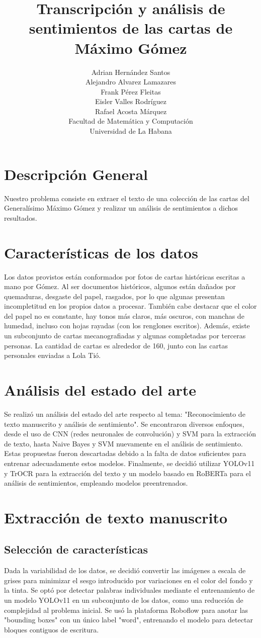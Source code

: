 \documentclass[11pt,a4paper]{article}
\title{Transcripción y análisis de sentimientos de las cartas de Máximo Gómez}
\author{
    Adrian Hernández Santos\\
    Alejandro Alvarez Lamazares\\
    Frank Pérez Fleitas\\
    Eisler Valles Rodríguez\\
    \vspace{5cm}
    Rafael Acosta Márquez\\
    \small{Facultad de Matemática y Computación}\\
    \small{Universidad de La Habana}
}
\begin{document}
\maketitle

\newpage

\section{Descripción General}
Nuestro problema consiste en extraer el texto de una colección de las cartas del Generalísimo Máximo Gómez y realizar un análisis de sentimientos a dichos resultados.

\section{Características de los datos}
Los datos provistos están conformados por fotos de cartas históricas escritas a mano por Gómez. 
Al ser documentos históricos, algunos están dañados por quemaduras, desgaste del papel, rasgados, por lo que algunas presentan incompletitud en los propios datos a procesar. 
También cabe destacar que el color del papel no es constante, hay tonos más claros, más oscuros, con manchas de humedad, incluso con hojas rayadas (con los renglones escritos). 
Además, existe un subconjunto de cartas mecanografiadas y algunas completadas por terceras personas. 
La cantidad de cartas es alrededor de 160, junto con las cartas personales enviadas a Lola Tió.

\section{Análisis del estado del arte}
Se realizó un análisis del estado del arte respecto al tema: "Reconocimiento de texto manuscrito y análisis de sentimiento". 
Se encontraron diversos enfoques, desde el uso de CNN (redes neuronales de convolución) y SVM para la extracción de texto, hasta Naive Bayes y SVM nuevamente en el análisis de sentimiento. 
Estas propuestas fueron descartadas debido a la falta de datos suficientes para entrenar adecuadamente estos modelos. 
Finalmente, se decidió utilizar YOLOv11 y TrOCR para la extracción del texto y un modelo basado en RoBERTa para el análisis de sentimientos, empleando modelos preentrenados.

\section{Extracción de texto manuscrito}
\subsection{Selección de características}
Dada la variabilidad de los datos, se decidió convertir las imágenes a escala de grises para minimizar el sesgo introducido por variaciones en el color del fondo y la tinta. 
Se optó por detectar palabras individuales mediante el entrenamiento de un modelo YOLOv11 en un subconjunto de los datos, como una reducción de complejidad al problema inicial. 
Se usó la plataforma Roboflow para anotar las "bounding boxes" con un único label "word", entrenando el modelo para detectar bloques contiguos de escritura.
\end{document}

